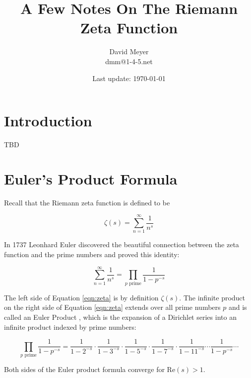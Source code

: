 \documentclass[11pt, oneside]{article}   	%
\title{A Few Notes On The Riemann Zeta Function}
\author{David Meyer \\ dmm@1-4-5.net}
\date{Last update: \today}							%
\theoremstyle{definition}
\begin{document}
\maketitle

\section{Introduction}
TBD

\section{Euler's Product Formula}
Recall that the Riemann zeta function is defined to be

\medskip
\begin{equation*}
\zeta(s) = \sum^\infty_{n = 1} \frac{1}{n^s}
\end{equation*}

\bigskip
\noindent
In 1737 Leonhard Euler \cite{euler_product_formula} discovered the beautiful connection between the zeta function and the prime numbers and proved this identity:

\medskip
\begin{equation}
\sum^\infty_{n = 1} \frac{1}{n^s} = \prod_{\text{$p$ prime}} \!  \frac{1}{1 - p^{-s}}
\label{eqn:zeta}
\end{equation}

\bigskip
\noindent
The left side of Equation \ref{eqn:zeta} is by definition $\zeta(s)$. The infinite product on the right side of Equation \ref{eqn:zeta}  extends over all prime numbers $p$ and is called an Euler 
Product \cite{euler_product}, which is the expansion of a Dirichlet series \cite{mccarthy2018} into an infinite product indexed by prime numbers:

\begin{equation*}
\prod_{\text{$p$ prime}} \!  \frac{1}{1 - p^{-s}} = \frac{1}{1 - 2^{-s}} \cdot \frac{1}{1 - 3^{-s}} \cdot  \frac{1}{1 - 5^{-s}} \cdot  \frac{1}{1 - 7^{-s}} \cdot  \frac{1}{1 - 11^{-s}} \cdots  \frac{1}{1 - p^{-s}} \cdots
\end{equation*}

\bigskip
\noindent
Both sides of the Euler product formula converge for $\text{Re}(s) > 1$.




\end{document}
